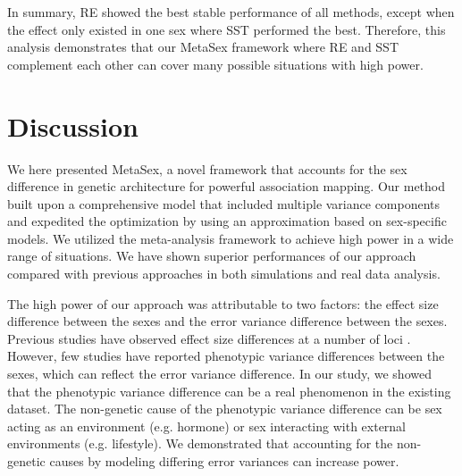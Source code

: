 \documentclass[11pt]{article}
\begin{document}
In summary, RE showed the best stable performance of all methods,
except when the effect only existed in one sex where SST performed the best.
Therefore, this analysis demonstrates that our MetaSex framework where RE and SST complement each other can cover many possible situations with high power.


\section{Discussion}

We here presented MetaSex, a novel framework that accounts for the sex difference in genetic architecture for powerful association mapping.
Our method built upon a comprehensive model that included multiple
variance components
and expedited the optimization by using an approximation based on sex-specific models.
We utilized the meta-analysis framework to achieve high power 
in a wide range of situations. We have shown superior performances of our approach compared with previous approaches 
in both simulations and real data analysis. 

The high power of our approach was attributable to two factors: the effect size difference between the sexes
and the error variance difference between the sexes.
Previous studies have observed effect size differences at a number of loci \citep{Randall:PlosGenet:2013}.
However, few studies have reported phenotypic variance differences between the sexes, which can reflect the error variance difference. 
In our study, we showed that the phenotypic variance difference can be a real phenomenon in the existing dataset.
The non-genetic cause of the phenotypic variance difference can be 
sex acting as an environment (e.g. hormone) or sex interacting with external environments (e.g. lifestyle).
We  demonstrated that accounting for the non-genetic causes by modeling differing error variances can increase power.

\end{document}
